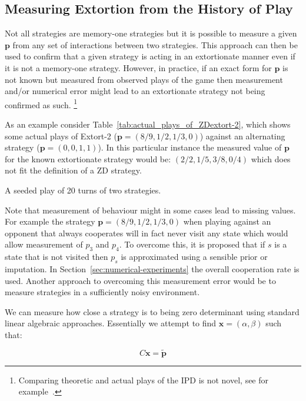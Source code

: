 \documentclass[a4paper]{article}
\begin{document}
\subsection{Measuring Extortion from the History of Play}

Not all strategies are memory-one strategies but it is possible to
measure a given \(\textbf{p}\) from any set of interactions between two strategies.
This approach can then be used to confirm that a given strategy is acting
in an extortionate manner even if it is not a memory-one strategy. However, in
practice, if an exact form for \(\textbf{p}\) is not known but measured from observed
plays of the game then measurement and/or numerical error might lead to an
extortionate strategy not being confirmed as such. \footnote{Comparing theoretic
and actual plays of the IPD is not novel, see for example~\cite{Rand2013}.}


As an example consider Table~\ref{tab:actual_plays_of_ZDextort-2}, which shows
some actual plays of Extort-2 (\(\textbf{p}=(8 / 9, 1 / 2, 1 / 3, 0)\)) against an
alternating strategy (\(\textbf{p}=(0, 0, 1, 1)\)). In this particular instance the
measured value of \(\textbf{p}\) for the known extortionate strategy would be:
\((2/2, 1/5, 3/8, 0/4)\) which does not fit the definition of a ZD strategy.


\begin{table}[!hbtp]
    
    \caption{A seeded play of 20 turns of two strategies.}
    \label{tab:actual_plays_of_ZDextort-2}
\end{table}


Note that measurement of behaviour might in some cases lead to missing values.
For example the strategy \(\textbf{p}=(8 / 9, 1 / 2, 1 / 3, 0)\) when playing against an
opponent that always cooperates will in fact never visit any state which would allow measurement
of \(p_3\) and \(p_4\). To overcome this, it is proposed that if \(s\) is a state
that is not visited then \(p_s\) is approximated using a sensible prior or
imputation. In Section~\ref{sec:numerical-experiments} the overall cooperation
rate is used. Another approach to overcoming this measurement error would be to
measure strategies in a sufficiently noisy environment.

We can measure how close a strategy is to being zero determinant using standard
linear algebraic approaches. Essentially we attempt to find \(\textbf{x}=(\alpha,
\beta)\) such that:

\begin{equation}\label{eqn:linear_algebraic_equation_for_p}
    C\textbf{x}= \tilde{\textbf{p}}
\end{equation}
\end{document}

